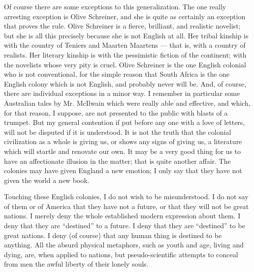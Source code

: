 Of course there are some exceptions to this generalization. The one really arresting exception is Olive Schreiner, and she is quite as certainly an exception that proves the rule. Olive Schreiner is a fierce, brilliant, and realistic novelist; but she is all this precisely because she is not English at all. Her tribal kinship is with the country of Teniers and Maarten Maartens — that is, with a country of realists. Her literary kinship is with the pessimistic fiction of the continent; with the novelists whose very pity is cruel. Olive Schreiner is the one English colonial who is not conventional, for the simple reason that South Africa is the one English colony which is not English, and probably never will be. And, of course, there are individual exceptions in a minor way. I remember in particular some Australian tales by Mr. McIlwain which were really able and effective, and which, for that reason, I suppose, are not presented to the public with blasts of a trumpet. But my general contention if put before any one with a love of letters, will not be disputed if it is understood. It is not the truth that the colonial civilization as a whole is giving us, or shows any signs of giving us, a literature which will startle and renovate our own. It may be a very good thing for us to have an affectionate illusion in the matter; that is quite another affair. The colonies may have given England a new emotion; I only say that they have not given the world a new book.

Touching these English colonies, I do not wish to be misunderstood. I do not say of them or of America that they have not a future, or that they will not be great nations. I merely deny the whole established modern expression about them. I deny that they are “destined” to a future. I deny that they are “destined” to be great nations. I deny (of course) that any human thing is destined to be anything. All the absurd physical metaphors, such as youth and age, living and dying, are, when applied to nations, but pseudo-scientific attempts to conceal from men the awful liberty of their lonely souls.

